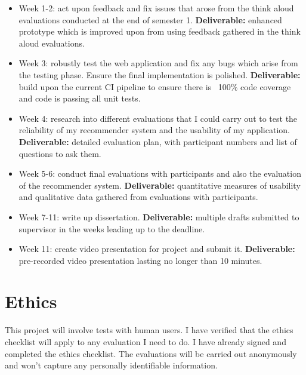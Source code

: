 \documentclass[11pt]{article}
\begin{document}
\begin{itemize}
\tightlist
\item Week 1-2: act upon feedback and fix issues that arose from the think aloud evaluations conducted at the end of semester 1. \textbf{Deliverable:} enhanced prototype which is improved upon from using feedback gathered in the think aloud evaluations.
\item Week 3: robustly test the web application and fix any bugs which arise from the testing phase. Ensure the final implementation is polished. \textbf{Deliverable:} build upon the current CI pipeline to ensure there is ~100\% code coverage and code is passing all unit tests.
\item Week 4: research into different evaluations that I could carry out to test the reliability of my recommender system and the usability of my application. \textbf{Deliverable:} detailed evaluation plan, with participant numbers and list of questions to ask them.
\item Week 5-6: conduct final evaluations with participants and also the evaluation of the recommender system. \textbf{Deliverable:} quantitative measures of usability and qualitative data gathered from evaluations with participants.
\item Week 7-11: write up dissertation. \textbf{Deliverable:} multiple drafts submitted to supervisor in the weeks leading up to the deadline.
\item Week 11: create video presentation for project and submit it. \textbf{Deliverable:} pre-recorded video presentation lasting no longer than 10 minutes.
\end{itemize}
    

\section{Ethics}

This project will involve tests with human users. I have verified that the ethics checklist will apply to any evaluation I need to do. I have already signed and completed the ethics checklist. The evaluations will be carried out anonymously and won't capture any personally identifiable information.
\end{document}
